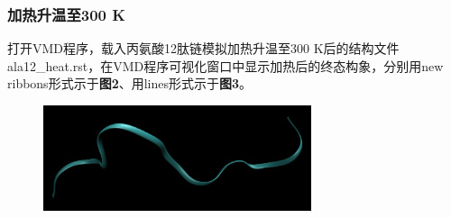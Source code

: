 \documentclass[12pt]{article}
\begin{document}
 	\subsubsection{加热升温至300 K}
打开VMD程序，载入丙氨酸12肽链模拟加热升温至300 K后的结构文件ala12\_heat.rst，在VMD程序可视化窗口中显示加热后的终态构象，分别用new ribbons形式示于\textbf{图2}、用lines形式示于\textbf{图3}。

\begin{figure}[h]
	\centering
	\includegraphics[width=0.7\textwidth]{new.png}
\end{figure}
\end{document}
